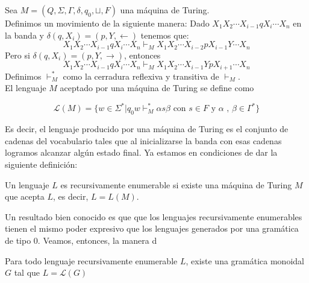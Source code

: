 \documentclass[../main.tex]{subfiles}
\begin{document}
	\begin{dfn}
		Sea $M=(Q, \Sigma, \Gamma, \delta, q_0, \sqcup, F)$ una máquina de Turing.  \\
		Definimos un movimiento de la siguiente manera:
		Dado $X_1 X_2 \cdots X_{i-1} q X_i \cdots X_n$ en la banda y $\delta (q, X_i)=(p,Y,\leftarrow)$ tenemos que:
		\[
			X_1 X_2 \cdots X_{i-1} q X_i \cdots X_n \vdash_M X_1 X_2 \cdots X_{i-2} p X_{i-1} Y \cdots X_n
		\] 
		Pero si $\delta (q, X_i)=(p,Y,\rightarrow)$, entonces 
		\[
		X_1 X_2 \cdots X_{i-1} q X_i \cdots X_n \vdash_M X_1 X_2 \cdots X_{i-1} Y p X_{i+1} \cdots X_n
		\] 
		Definimos $\vdash^*_M$ como la cerradura reflexiva y transitiva de $\vdash_M$. \\
		El lenguaje $M$ aceptado por una máquina de Turing se define como
		
		$$
			\mathcal{L}(M)= \{ w \in \Sigma ^* | q_0w \vdash_M^* \alpha s \beta\text{ con }s\in F \text{ y } \alpha \text{ , } \beta \in \Gamma^*\}
		$$
		 
	\end{dfn}
Es decir, el lenguaje producido por una máquina de Turing es el conjunto de cadenas del vocabulario tales que al inicializarse la banda con esas cadenas logramos alcanzar algún estado final. Ya estamos en condiciones de dar la siguiente definición: 

\begin{dfn}
	Un lenguaje $L$ es recursivamente enumerable si existe una máquina de Turing $M$ que acepta $L$, es decir, $L=L(M)$.
\end{dfn}
	
Un resultado bien conocido es que que los lenguajes recursivamente enumerables tienen el mismo poder expresivo que los lenguajes generados por una gramática de tipo $0$. Veamos, entonces, la manera d 

\begin{prop}

	Para todo lenguaje recursivamente enumerable $L$, existe una gramática monoidal $G$ tal que $L=\mathcal{L}(G)$ 
	
\end{prop}
\end{document}
